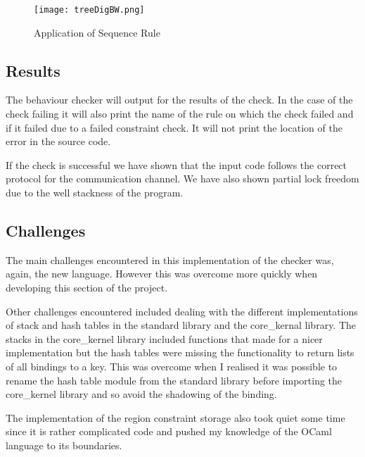 \begin{figure}
\texttt{[image: treeDigBW.png]}
\caption{Application of Sequence Rule}
\label{seq}
\end{figure}

\subsection{Results}
The behaviour checker will output for the results of the check. In the case of the check failing it will also print the name of the rule on which the check failed and if it failed due to a failed constraint check. It will not print the location of the error in the source code.

If the check is successful we have shown that the input code follows the correct protocol for the communication channel. We have also shown partial lock freedom due to the well stackness of the program. 

\subsection{Challenges}
The main challenges encountered in this implementation of the checker was, again, the new language. However this was overcome more quickly when developing this section of the project.

Other challenges encountered included dealing with the different implementations of stack and hash tables in the standard library and the core_kernal library. The stacks in the core_kernel library included functions that made for a nicer implementation but the hash tables were missing the functionality to return lists of all bindings to a key. This was overcome when I realised it was possible to rename the hash table module from the standard library before importing the core_kernel library and so avoid the shadowing of the binding. 

The implementation of the region constraint storage also took quiet some time since it is rather complicated code and pushed my knowledge of the OCaml language to its boundaries. 


